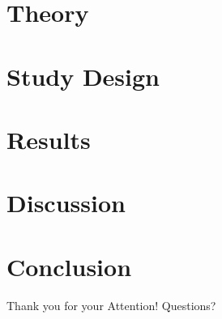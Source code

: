 \documentclass[aspectratio=169,xcolor=dvipsnames]{beamer}
\begin{document}

\section{Theory}



\section{Study Design}




\section{Results}








\section{Discussion}




\section{Conclusion}




\begin{frame}
Thank you for your Attention! Questions?


\end{frame}


%   
%   




\end{document}
